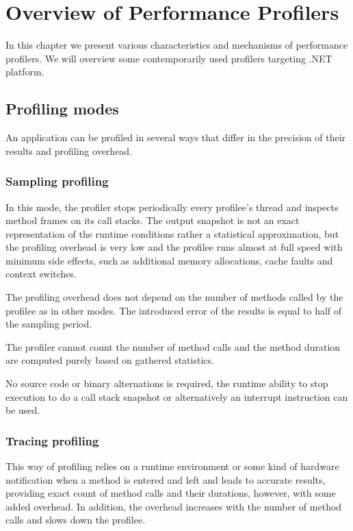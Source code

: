 \chapter{Overview of Performance Profilers }

In this chapter we present various characteristics and mechanisms of performance profilers. We will overview some contemporarily used profilers targeting .NET platform.

\label{01ProfModes}
\section{Profiling modes}
An application can be profiled in several ways that differ in the precision of their results and profiling overhead. 

\subsection{Sampling profiling}
In this mode, the profiler stops periodically every profilee's thread and inspects method frames on its call stacks. The output snapshot is not an exact representation of the runtime conditions rather a statistical approximation, but the profiling overhead is very low and the profilee runs almost at full speed with minimum side effects, such as additional memory allocations, cache faults and context switches.

The profiling overhead does not depend on the number of methods called by the profilee as in other modes. The introduced error of the results is equal to half of the sampling period.

The profiler cannot count the number of method calls and the method duration are computed purely based on gathered statistics. 

No source code or binary alternations is required, the runtime ability to stop execution to do a call stack snapshot or alternatively an interrupt instruction can be used.

\subsection{Tracing profiling}
This way of profiling relies on a runtime environment or some kind of hardware notification when a method is entered and left and leads to accurate results, providing exact count of method calls and their durations, however, with some added overhead. In addition, the overhead increases with the number of method calls and slows down the profilee.

